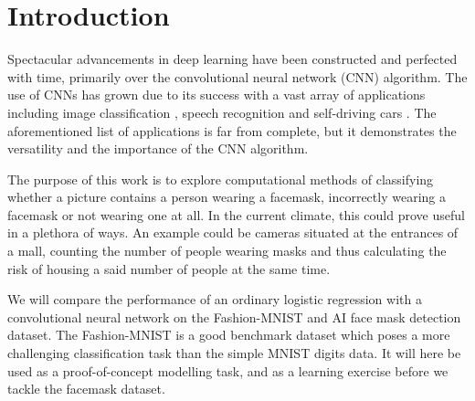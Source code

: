 \documentclass[../main.tex]{subfiles}
\begin{document}
\section{Introduction}
Spectacular advancements in deep learning have been constructed and perfected with time, primarily over the convolutional neural network (CNN) algorithm. The use of CNNs has grown due to its success with a vast array of applications including image classification \cite{He_2016_CVPR}, speech recognition \cite{AbdelHamid2013ExploringCN} and self-driving cars \cite{Wu_2017_CVPR_Workshops}. The aforementioned list of applications is far from complete, but it demonstrates the versatility and the importance of the CNN algorithm. 

The purpose of this work is to explore computational methods of classifying whether a picture contains a person wearing a facemask, incorrectly wearing a facemask or not wearing one at all. In the current climate, this could prove useful in a plethora of ways. An example could be cameras situated at the entrances of a mall, counting the number of people wearing masks and thus calculating the risk of housing a said number of people at the same time.

We will compare the performance of an ordinary logistic regression with a convolutional neural network on the Fashion-MNIST and AI face mask detection dataset. The Fashion-MNIST is a good benchmark dataset which poses a more challenging classification task than the simple MNIST digits data. It will here be used as a proof-of-concept modelling task, and as a learning exercise before we tackle the facemask dataset.
\end{document}
